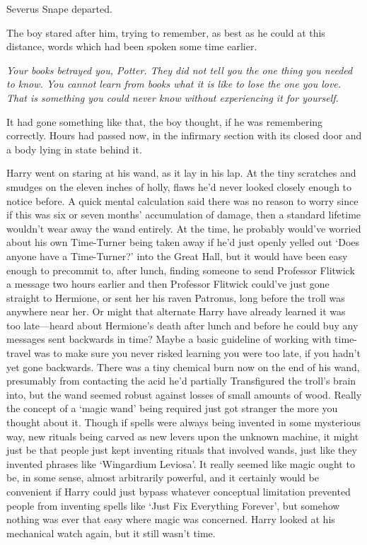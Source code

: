 Severus Snape departed.

The boy stared after him, trying to remember, as best as he could at this
distance, words which had been spoken some time earlier.

\emph{Your books betrayed you, Potter. They did not tell you the one thing you
needed to know. You cannot learn from books what it is like to lose the one you
love. That is something you could never know without experiencing it for
yourself.}

It had gone something like that, the boy thought, if he was remembering
correctly.
\later
Hours had passed now, in the infirmary section with its closed door and a body
lying in state behind it.

Harry went on staring at his wand, as it lay in his lap. At the tiny scratches
and smudges on the eleven inches of holly, flaws he'd never looked closely
enough to notice before. A quick mental calculation said there was no reason to
worry since if this was six or seven months' accumulation of damage, then a
standard lifetime wouldn't wear away the wand entirely. At the time, he
probably would've worried about his own Time-Turner being taken away if he'd
just openly yelled out `Does anyone have a Time-Turner?' into the Great Hall,
but it would have been easy enough to precommit to, after lunch, finding
someone to send Professor Flitwick a message two hours earlier and then
Professor Flitwick could've just gone straight to Hermione, or sent her his
raven Patronus, long before the troll was anywhere near her. Or might that
alternate Harry have already learned it was too late---heard about Hermione's
death after lunch and before he could buy any messages sent backwards in time?
Maybe a basic guideline of working with time-travel was to make sure you never
risked learning you were too late, if you hadn't yet gone backwards. There was
a tiny chemical burn now on the end of his wand, presumably from contacting the
acid he'd partially Transfigured the troll's brain into, but the wand seemed
robust against losses of small amounts of wood. Really the concept of a `magic
wand' being required just got stranger the more you thought about it. Though if
spells were always being invented in some mysterious way, new rituals being
carved as new levers upon the unknown machine, it might just be that people
just kept inventing rituals that involved wands, just like they invented
phrases like `Wingardium Leviosa'. It really seemed like magic ought to be, in
some sense, almost arbitrarily powerful, and it certainly would be convenient
if Harry could just bypass whatever conceptual limitation prevented people from
inventing spells like `Just Fix Everything Forever', but somehow nothing was
ever that easy where magic was concerned. Harry looked at his mechanical watch
again, but it still wasn't time.


